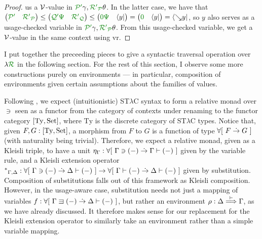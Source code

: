 \begin{proof}
  us a $\mathcal V$-value in $\grPprime\gamma, \grR\gr'_\grP\theta$.
  In the latter case, we have that
  $\begin{pmatrix} \grPprime & \grR\gr'_\grP \end{pmatrix}
  \leq \begin{pmatrix} \grQprime\gr\Psi & \grR\gr'_\grQ \end{pmatrix}
  \leq \begin{pmatrix} \gr0\gr\Psi & \langle y \rvert \end{pmatrix}
  = \begin{pmatrix} \gr0 & \langle y \rvert \end{pmatrix}
  = \left\langle {\searrow}y \right\rvert$, so $y$ also serves as a
  usage-checked variable in $\grPprime\gamma, \grR\gr'_\grP\theta$.
  From this usage-checked variable, we get a $\mathcal V$-value in the same context
  using $\mathrm{vr}$.
\end{proof}

I put together the preceeding pieces to give a syntactic traversal operation over
$\name$ in the following section.
For the rest of this section, I observe some more constructions purely on
environments --- in particular, composition of environments given certain
assumptions about the families of values.

Following \citet{ACU15}, we expect (intuitionistic) ST$\lambda$C syntax to form
a relative monad over $\ni$ seen as a functor from the category of contexts
under renaming to the functor category $\blr{\mathrm{Ty}, \Set}$, where
$\mathrm{Ty}$ is the discrete category of ST$\lambda$C types.
Notice that, given $F,G : \blr{\mathrm{Ty}, \Set}$, a morphism from $F$ to $G$
is a function of type $\forallb{F \dotto G}$ (with naturality being trivial).
Therefore, we expect a relative monad, given as a Kleisli triple, to have a unit
$\eta_\Gamma : \forallb{\Gamma \ni \plr{-} \dotto \Gamma \vdash \plr{-}}$
given by the variable rule, and a Kleisli extension operator
${^*}_{\Gamma,\Delta} :
\forallb{\Gamma \ni \plr{-} \dotto \Delta \vdash \plr{-}} \to
\forallb{\Gamma \vdash \plr{-} \dotto \Delta \vdash \plr{-}}$
given by substitution.
Composition of substitutions falls out of this framework as Kleisli composition.
However, in the usage-aware case, substitution needs not just a mapping of
variables $f : \forallb{\Gamma \sqni \plr{-} \dotto \Delta \vdash \plr{-}}$,
but rather an environment $\rho : \Delta \stackrel{\vdash}\Longrightarrow \Gamma$, as we have already
discussed.
It therefore makes sense for our replacement for the Kleisli extension operator
to similarly take an environment rather than a simple variable mapping.

